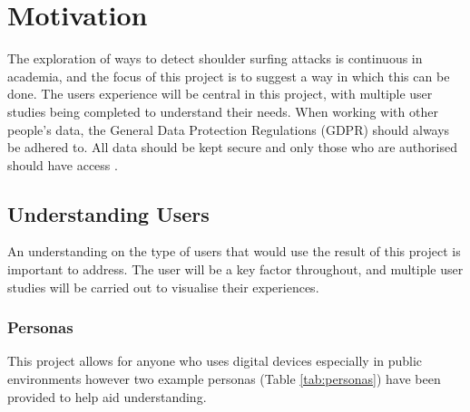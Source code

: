 \documentclass[12pt]{article}
\theoremstyle{plain}
\theoremstyle{definition}
\begin{document}
\section{Motivation}
\label{sec:motivation} 

The exploration of ways to detect shoulder surfing attacks is continuous in academia, and the focus of this project is to suggest a way in which this can be done. The users experience will be central in this project, with multiple user studies being completed to understand their needs.
When working with other people's data, the General Data Protection Regulations (GDPR) \cite{noauthor_data_nodate} should always be adhered to. All data should be kept secure and only those who are authorised should have access \cite{noauthor_data_nodate}.

\subsection{Understanding Users}
An understanding on the type of users that would use the result of this project is important to address. The user will be a key factor throughout, and multiple user studies will be carried out to visualise their experiences.

\subsubsection{Personas}
This project allows for anyone who uses digital devices especially in public environments however two example personas (Table \ref{tab:personas}) have been provided to help aid understanding.
\end{document}
